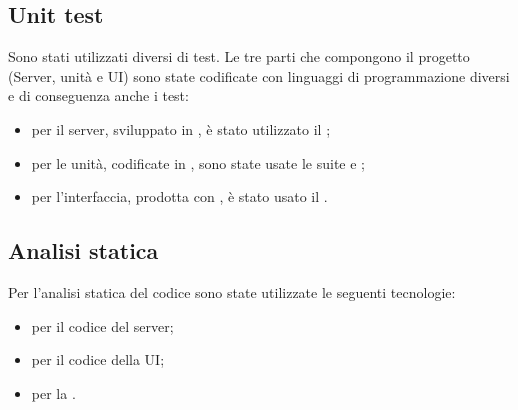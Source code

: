 \subsection{Unit test}
	Sono stati utilizzati diversi  di test. Le tre parti che compongono il progetto (Server, unità e UI) sono state codificate con linguaggi di programmazione diversi e di conseguenza anche i test:
	\begin{itemize}
		\item per il server, sviluppato in , è stato utilizzato il  ;
		\item per le unità, codificate in , sono state usate le suite  e ;
		\item per l'interfaccia, prodotta con , è stato usato il  .
	\end{itemize}
	
\subsection{Analisi statica}
	Per l'analisi statica del codice sono state utilizzate le seguenti tecnologie:
	\begin{itemize}
		\item {} per il codice  del server;
		\item {} per il codice della UI;
		\item {} per la .
	\end{itemize}
